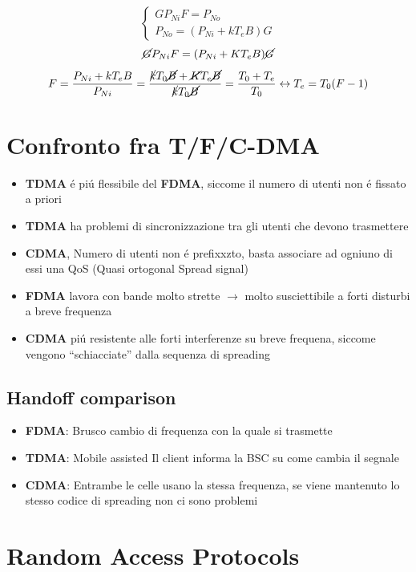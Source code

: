 \documentclass{article}
\begin{document}
\[
\begin{cases}
    G P_{Ni} F = P_{No}\\
    P_{No} = (P_{Ni} + kT_eB)G
\end{cases}
\]
\[ \cancel{G} P_{Ni} F = (P_{Ni} + KT_e B) \cancel{G} \]
\[ F = \frac{P_{Ni} + kT_e B}{P_{Ni}} = \frac{\cancel{k}T_0\cancel{B} + \cancel{K}T_e\cancel{B}}{\cancel{k}T_0\cancel{B}} = \frac{T_0 + T_e}{T_0} \leftrightarrow T_e = T_0 (F-1)\]

\section{Confronto fra T/F/C-DMA}
\begin{itemize}
    \item \textbf{TDMA} \'e pi\'u flessibile del \textbf{FDMA}, siccome il numero di utenti non \'e fissato a priori
    \item \textbf{TDMA} ha problemi di sincronizzazione tra gli utenti che devono trasmettere
    \item \textbf{CDMA}, Numero di utenti non \'e prefixxzto, basta associare ad ogniuno di essi una QoS (Quasi ortogonal Spread signal)
    \item \textbf{FDMA} lavora con bande molto strette $\rightarrow$ molto susciettibile a forti disturbi a breve frequenza
    \item \textbf{CDMA} pi\'u resistente alle forti interferenze su breve frequena, siccome vengono ``schiacciate'' dalla sequenza di spreading
\end{itemize}
\subsection{Handoff comparison}
\begin{itemize}
    \item \textbf{FDMA}: Brusco cambio di frequenza con la quale si trasmette
    \item \textbf{TDMA}: Mobile assisted Il client informa la BSC su come cambia il segnale
    \item \textbf{CDMA}: Entrambe le celle usano la stessa frequenza, se viene mantenuto lo stesso codice di spreading non ci sono problemi
    \end{itemize}

\newpage
\section{Random Access Protocols}
\end{document}

